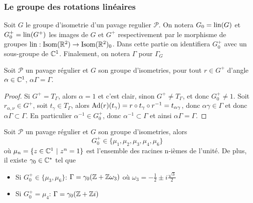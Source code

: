 \subsubsection{Le groupe des rotations linéaires}

\begin{notation}
	Soit $G$ le groupe d'isometrie d'un pavage regulier $\mathcal{P}$. On notera
	$G_0 = \operatorname{lin}(G)$ et $G_0^+ = \operatorname{lin}(G^+)$ les images de $G$ et $G^+$
	respectivement par le morphisme de groupes
	$\operatorname{lin}: \operatorname{Isom}(\mathbb{R}^2) \to \operatorname{Isom}(\mathbb{R}^2)_0$.
	Dans cette partie on identifiera $G_0^+$ avec un sous-groupe de $\mathbb{C}^1$.
	Finalement, on notera $\Gamma$ pour $\Gamma_G$
\end{notation}

\begin{lemma}
	\label{lem:invariance-rotation}
	Soit $\mathcal{P}$ un pavage régulier et $G$ son groupe d'isometries, pour
	tout $r \in G^+$ d'angle $\alpha \in \mathbb{C}^1$, $\alpha\Gamma = \Gamma$.
\end{lemma}

\begin{proof}
	Si $G^+ = T_\Gamma$, alors $\alpha = 1$ et c'est clair,
	sinon $G^+ \neq T_\Gamma$, et donc $G_0^+ \neq {1}$.
	Soit $r_{\alpha, \nu} \in G^+$, soit $t_\gamma \in T_\Gamma$, alors
	$\operatorname{Ad}(r)(t_\gamma) = r \circ t_\gamma \circ r^{-1} = t_{\alpha\gamma}$,
	donc $\alpha\gamma \in \Gamma$ et donc $\alpha\Gamma \subset \Gamma$.
	En particulier $\alpha^{-1} \in G_0^+$, donc $\alpha^{-1} \subset \Gamma$
	et ainsi $\alpha \Gamma = \Gamma$.
\end{proof}

\begin{theorem}
	\label{thn:pavage-rotations}
	Soit $\mathcal{P}$ un pavage régulier et $G$ son groupe d'isometries,
	alors 
	\begin{equation*}
		G_0^+ \in \{\mu_1, \mu_2, \mu_3, \mu_4, \mu_6\}
	\end{equation*}
	où $\mu_n = \{z \in \mathbb{C}^1\ |\ z^n = 1\}$ est l'ensemble des racines n-ièmes de
	l'unité. De plus, il existe $\gamma_0 \in \mathbb{C}^*$ tel que
	\begin{itemize}
		\item Si $G_0^+ \in \{\mu_3, \mu_6\}$: $\Gamma = \gamma_0(\mathbb{Z} + \mathbb{Z}\omega_3)$
			où $\omega_3 = -\frac{1}{2} \pm i \frac{\sqrt{3}}{2}$
		\item Si $G_0^+ = \mu_ 4$: $\Gamma = \gamma_0(\mathbb{Z} + \mathbb{Z} i)$
	\end{itemize}
\end{theorem}

